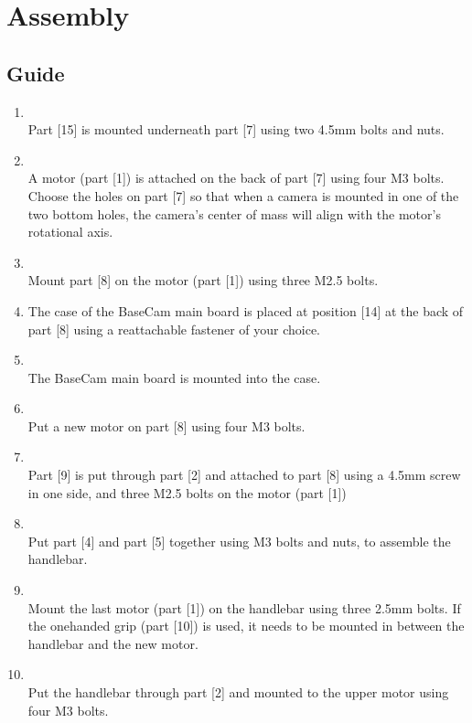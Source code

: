 \chapter{Assembly}


\section{Guide}
\begin{enumerate}[label=\bfseries Step \arabic*]
\item \hfill \\
Part [15] is mounted underneath part [7] using two 4.5mm bolts and nuts.
\item \hfill \\
A motor (part [1]) is attached on the back of part [7] using four M3 bolts. Choose the holes on part [7] so that when a camera is mounted in one of the two bottom holes, the camera’s center of mass will align with the motor’s rotational axis.
\item \hfill \\
Mount part [8] on the motor (part [1]) using three M2.5 bolts.
\item The case of the BaseCam main board is placed at position [14] at the back of part [8] using a reattachable fastener of your choice.
\item \hfill \\
The BaseCam main board is mounted into the case.
\item \hfill \\
Put a new motor on part [8] using four M3 bolts.
\item \hfill \\
Part [9] is put through part [2] and attached to part [8] using a 4.5mm screw in one side, and
three M2.5 bolts on the motor (part [1])
\item \hfill \\
Put part [4] and part [5] together using M3 bolts and nuts, to assemble the handlebar.
\item \hfill \\
Mount the last motor (part [1]) on the handlebar using three 2.5mm bolts. If the onehanded grip (part [10]) is used, it needs to be mounted in between the handlebar and the new motor.
\item \hfill \\
Put the handlebar through part [2] and mounted to the upper motor using four M3 bolts.

\end{enumerate}
